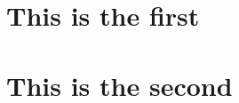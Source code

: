 \documentclass{article}
\begin{document}
\newcommand{\gn}[1]{{\small \textbf{\color{magenta}[GN-- #1]}}}

\newcommand{\jl}[1]{{\small \textbf{\color{red}[JL-- #1]}}}

\newcommand{\alex}[1]{{\small \textbf{\color{blue}[alex-- #1]}}}

\newcommand{\ed}[1]{{\small \textbf{\color{OliveGreen}[ed-- #1]}}}

\newcommand{\claire}[1]{{\small \textbf{\color{RawSienna}[claire-- #1]}}}

\newcommand{\pcyin}[1]{{\small \textbf{\color{cyan}[pcyin-- #1]}}}

\begin{appendices}
\section{This is the first}

\section{This is the second}

\end{appendices}
\end{document}
